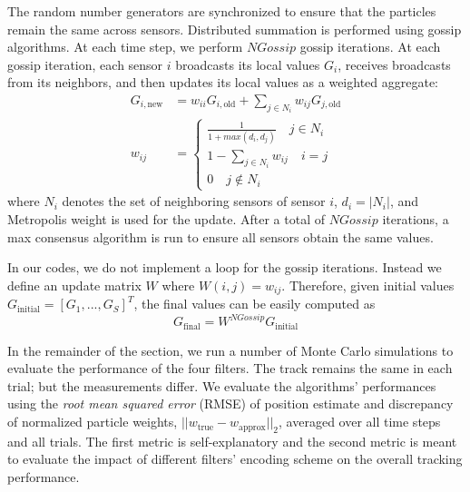 \documentclass[10pt,letterpaper,final]{article}
\begin{document}
The random number generators are synchronized to ensure that the particles remain the same across sensors. Distributed summation is performed using gossip algorithms. At each time step, we perform $NGossip$ gossip iterations. At each gossip iteration, each sensor $i$ broadcasts its local values $G_i$, receives broadcasts from its neighbors, and then updates its local values as a weighted aggregate:
\begin{align}
G_{i,\text{new}} &= w_{ii}G_{i,\text{old}} + \sum_{j\in N_i}w_{ij}G_{j,\text{old}} \\
w_{ij} &=
\begin{cases}
\frac{1}{1+max(d_i, d_j)} \quad j\in N_i \\
1-\sum_{j\in N_i}w_{ij} \quad i=j \\
0 \quad j\notin N_i
\end{cases}
\label{eqn:metropolis_weight}
\end{align}
where $N_i$ denotes the set of neighboring sensors of sensor $i$, $d_i=|N_i|$, and Metropolis weight is used for the update. After a total of $NGossip$ iterations, a max consensus algorithm is run to ensure all sensors obtain the same values. 

In our codes, we do not implement a loop for the gossip iterations. Instead we define an update matrix $W$ where $W(i,j)=w_{ij}$. Therefore, given initial values $G_{\text{initial}}=[G_1,...,G_S]^T$, the final values can be easily computed as 
\begin{equation}
G_{\text{final}} = W^{NGossip}G_{\text{initial}}
\end{equation}

In the remainder of the section, we run a number of Monte Carlo simulations to evaluate the performance of the four filters. The track remains the same in each trial; but the measurements differ. We evaluate the algorithms' performances using the \textit{root mean squared error} (RMSE) of position estimate and discrepancy of normalized particle weights, $||w_{\text{true}}-w_{\text{approx}}||_2$, averaged over all time steps and all trials. The first metric is self-explanatory and the second metric is meant to evaluate the impact of different filters' encoding scheme on the overall tracking performance.

\end{document}
